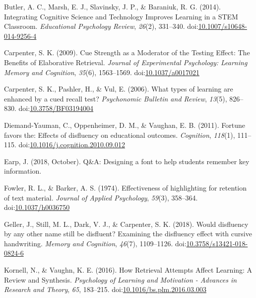 \documentclass[jou]{apa6}
\begin{document}
\leavevmode\hypertarget{ref-Butler2014}{}%
Butler, A. C., Marsh, E. J., Slavinsky, J. P., \& Baraniuk, R. G. (2014). Integrating Cognitive Science and Technology Improves Learning in a STEM Classroom. \emph{Educational Psychology Review}, \emph{26}(2), 331--340. doi:\href{https://doi.org/10.1007/s10648-014-9256-4}{10.1007/s10648-014-9256-4}

\leavevmode\hypertarget{ref-Carpenter2009}{}%
Carpenter, S. K. (2009). Cue Strength as a Moderator of the Testing Effect: The Benefits of Elaborative Retrieval. \emph{Journal of Experimental Psychology: Learning Memory and Cognition}, \emph{35}(6), 1563--1569. doi:\href{https://doi.org/10.1037/a0017021}{10.1037/a0017021}

\leavevmode\hypertarget{ref-Carpenter2006}{}%
Carpenter, S. K., Pashler, H., \& Vul, E. (2006). What types of learning are enhanced by a cued recall test? \emph{Psychonomic Bulletin and Review}, \emph{13}(5), 826--830. doi:\href{https://doi.org/10.3758/BF03194004}{10.3758/BF03194004}

\leavevmode\hypertarget{ref-Diemand-Yauman2011}{}%
Diemand-Yauman, C., Oppenheimer, D. M., \& Vaughan, E. B. (2011). Fortune favors the: Effects of disfluency on educational outcomes. \emph{Cognition}, \emph{118}(1), 111--115. doi:\href{https://doi.org/10.1016/j.cognition.2010.09.012}{10.1016/j.cognition.2010.09.012}

\leavevmode\hypertarget{ref-Earp2018}{}%
Earp, J. (2018, October). Q\&A: Designing a font to help students remember key information.

\leavevmode\hypertarget{ref-Fowler1974}{}%
Fowler, R. L., \& Barker, A. S. (1974). Effectiveness of highlighting for retention of text material. \emph{Journal of Applied Psychology}, \emph{59}(3), 358--364. doi:\href{https://doi.org/10.1037/h0036750}{10.1037/h0036750}

\leavevmode\hypertarget{ref-Geller2018}{}%
Geller, J., Still, M. L., Dark, V. J., \& Carpenter, S. K. (2018). Would disfluency by any other name still be disfluent? Examining the disfluency effect with cursive handwriting. \emph{Memory and Cognition}, \emph{46}(7), 1109--1126. doi:\href{https://doi.org/10.3758/s13421-018-0824-6}{10.3758/s13421-018-0824-6}

\leavevmode\hypertarget{ref-Kornell2016}{}%
Kornell, N., \& Vaughn, K. E. (2016). How Retrieval Attempts Affect Learning: A Review and Synthesis. \emph{Psychology of Learning and Motivation - Advances in Research and Theory}, \emph{65}, 183--215. doi:\href{https://doi.org/10.1016/bs.plm.2016.03.003}{10.1016/bs.plm.2016.03.003}
\end{document}
